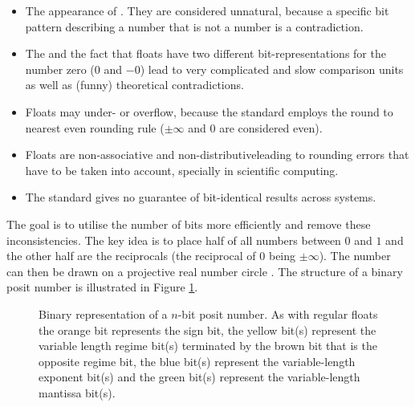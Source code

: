 \documentclass{article}
\theoremstyle{plain} %
\theoremstyle{convention} %
\theoremstyle{remark} %
\numberwithin{equation}{section}
\begin{document}
\begin{itemize}
    \item The appearance of . They are considered unnatural, because a specific bit pattern describing a number that is not a number is a contradiction.
    \item The  and the fact that floats have two different bit-representations for the number zero ($0$ and $-0$) lead to very complicated and slow comparison units as well as (funny) theoretical contradictions\footnotemark.


    \item Floats may under- or overflow, because the standard employs the round to nearest even rounding rule ($\pm \infty$ and $0$ are considered even).
    \item Floats are non-associative and non-distributive\footnotemark leading to rounding errors that have to be taken into account, specially in scientific computing.
    \item The standard gives no guarantee of bit-identical results across systems.
\end{itemize}



The goal is to utilise the number of bits more efficiently and remove these inconsistencies. The key idea is to place half of all numbers between $0$ and $1$ and the other half are the reciprocals (the reciprocal of $0$ being $\pm \infty$). The number can then be drawn on a projective real number circle \cite{gustafson2017}. The structure of a binary posit number is illustrated in Figure \ref{fig:posit}.

\begin{figure}[H]
  \caption{Binary representation of a $n$-bit posit number. As with regular floats the \textcolor{corange}{orange} bit represents the \textcolor{corange}{sign bit}, the \textcolor{cyellow}{yellow} bit(s) represent the variable length \textcolor{cyellow}{regime bit(s)} terminated by the \textcolor{cbrown}{brown} bit that is the \textcolor{cbrown}{opposite regime bit}, the \textcolor{cblue}{blue} bit(s) represent the variable-length \textcolor{cblue}{exponent bit(s)} and the \textcolor{cgreen}{green} bit(s) represent the variable-length \textcolor{cgreen}{mantissa bit(s)}.}
  \label{fig:posit}
\end{figure}
\end{document}

